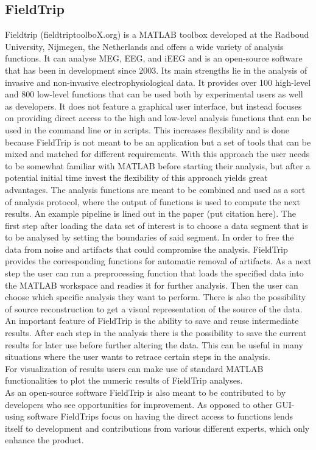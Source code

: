 \subsection{FieldTrip}
Fieldtrip (fieldtriptoolboX.org) is a MATLAB toolbox developed at the Radboud University,  Nijmegen,  the Netherlands and offers a wide variety of analysis functions.  It can analyse MEG, EEG, and iEEG and is an open-source software that has been in development since 2003. Its main strengths lie in the analysis of invasive and non-invasive electrophysiological data. It provides over 100 high-level and 800 low-level functions that can be used both by experimental users as well as developers. It does not feature a graphical user interface, but instead focuses on providing direct access to the high and low-level analysis functions that can be used in the command line or in scripts.  This increases flexibility and is done because FieldTrip is not meant to be an application but a set of tools that can be mixed and matched for different requirements.
With this approach the user needs to be somewhat familiar with MATLAB before starting their analysis, but after a potential initial time invest the flexibility of this approach yields great advantages.
The analysis functions are meant to be combined and used as a sort of analysis protocol, where the output of functions is used to compute the next results. 
An example pipeline is lined out in the paper (put citation here). The first step after loading the data set of interest is to choose a data segment that is to be analysed by setting the boundaries of said segment. In order to free the data from noise and artifacts that could compromise the analysis. FieldTrip provides the corresponding functions for automatic removal of artifacts. As a next step the user can run a preprocessing function that loads the specified data into the MATLAB workspace and readies it for further analysis. Then the user can choose which specific analysis they want to perform. There is also the possibility of source reconstruction to get a visual representation of the source of the data.\\
An important feature of FieldTrip is the ability to save and reuse intermediate results. After each step in the analysis there is the possibility to save the current results for later use before further altering the data. This can be useful in many situations where the user wants to retrace certain steps in the analysis.\\
For visualization of results users can make use of standard MATLAB functionalities to plot the numeric results of FieldTrip analyses.\\
As an open-source software FieldTrip is also meant to be contributed to by developers who see opportunities for improvement. As opposed to other GUI-using software FieldTrips focus on having the direct access to functions lends itself to development and contributions from various different experts, which only enhance the product.

